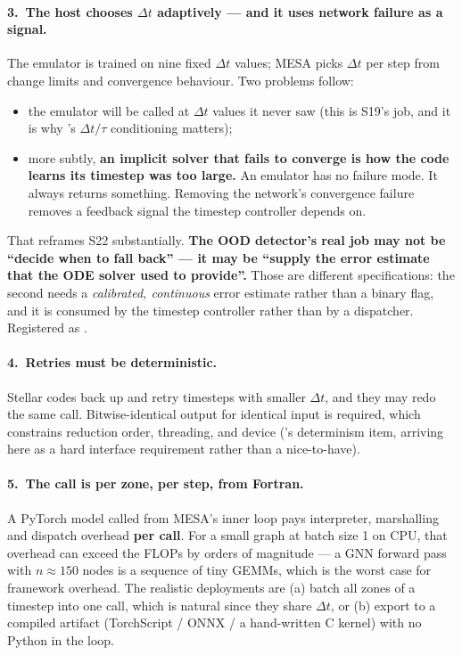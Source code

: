 \paragraph{3.\ The host chooses $\Delta t$ adaptively --- and it uses network
failure as a signal.} The emulator is trained on nine fixed $\Delta t$ values;
MESA picks $\Delta t$ per step from change limits and convergence behaviour. Two
problems follow:

\begin{itemize}
\item the emulator will be called at $\Delta t$ values it never saw (this is
  S19's job, and it is why 's $\Delta t/\tau$ conditioning
  matters);
\item more subtly, \textbf{an implicit solver that fails to converge is how the
  code learns its timestep was too large.} An emulator has no failure mode. It
  always returns something. Removing the network's convergence failure removes
  a feedback signal the timestep controller depends on.
\end{itemize}

That reframes S22 substantially. \textbf{The OOD detector's real job may not be
``decide when to fall back'' --- it may be ``supply the error estimate that the
ODE solver used to provide''.} Those are different specifications: the second
needs a \emph{calibrated, continuous} error estimate rather than a binary flag,
and it is consumed by the timestep controller rather than by a dispatcher.
Registered as .

\paragraph{4.\ Retries must be deterministic.} Stellar codes back up and retry
timesteps with smaller $\Delta t$, and they may redo the same call.
Bitwise-identical output for identical input is required, which constrains
reduction order, threading, and device ('s determinism item,
arriving here as a hard interface requirement rather than a nice-to-have).

\paragraph{5.\ The call is per zone, per step, from Fortran.} A PyTorch model
called from MESA's inner loop pays interpreter, marshalling and dispatch
overhead \textbf{per call}. For a small graph at batch size 1 on CPU, that
overhead can exceed the FLOPs by orders of magnitude --- a GNN forward pass with
$n \approx 150$ nodes is a sequence of tiny GEMMs, which is the worst case for
framework overhead. The realistic deployments are (a) batch all zones of a
timestep into one call, which is natural since they share $\Delta t$, or (b)
export to a compiled artifact (TorchScript / ONNX / a hand-written C kernel)
with no Python in the loop.


